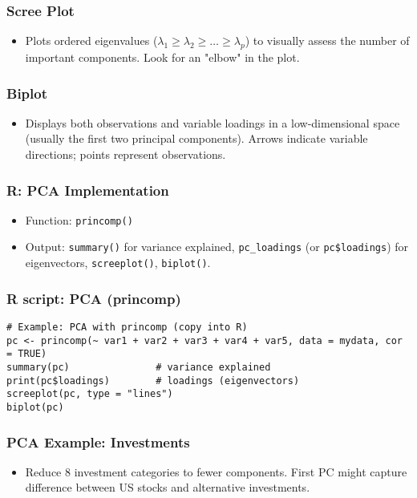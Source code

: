 \documentclass{beamer}
\newcommand{\code}[1]{\texttt{#1}}
\begin{document}
\begin{frame}
    \frametitle{Scree Plot}
    \begin{itemize}
        \item Plots ordered eigenvalues ($\lambda_1 \ge \lambda_2 \ge \dots \ge \lambda_p$) to visually assess the number of important components. Look for an "elbow" in the plot.
    \end{itemize}
\end{frame}

\begin{frame}
    \frametitle{Biplot}
    \begin{itemize}
        \item Displays both observations and variable loadings in a low-dimensional space (usually the first two principal components). Arrows indicate variable directions; points represent observations.
    \end{itemize}
\end{frame}

\begin{frame}
    \frametitle{R: PCA Implementation}
    \begin{itemize}
        \item Function: \code{princomp()}
        \item Output: \code{summary()} for variance explained, \texttt{pc\_loadings} (or \code{pc\$loadings}) for eigenvectors, \code{screeplot()}, \code{biplot()}.
    \end{itemize}
\end{frame}

\begin{frame}[fragile]
    \frametitle{R script: PCA (princomp)}
    \begin{verbatim}
# Example: PCA with princomp (copy into R)
pc <- princomp(~ var1 + var2 + var3 + var4 + var5, data = mydata, cor = TRUE)
summary(pc)               # variance explained
print(pc$loadings)        # loadings (eigenvectors)
screeplot(pc, type = "lines")
biplot(pc)
    \end{verbatim}
\end{frame}

\begin{frame}
    \frametitle{PCA Example: Investments}
    \begin{itemize}
        \item Reduce 8 investment categories to fewer components. First PC might capture difference between US stocks and alternative investments.
    \end{itemize}
\end{frame}
\end{document}
